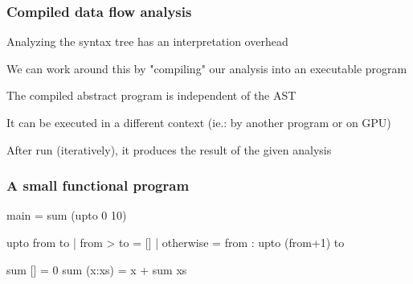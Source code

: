\documentclass[bigger]{beamer}
\begin{document}
\begin{frame}
\frametitle{Compiled data flow analysis}

\begin{vfitemize}
	\item Analyzing the syntax tree has an interpretation overhead
	\item We can work around this by "compiling" our analysis into an executable program
	\item The compiled abstract program is independent of the AST
	\item It can be executed in a different context (ie.: by another program or on GPU)
	\item After run (iteratively), it produces the result of the given analysis
\end{vfitemize}
\end{frame}






















\begin{frame}

\end{frame}

\begin{frame}[fragile]
	\frametitle{A small functional program}
	
	\begin{haskellcode}
	  main = sum (upto 0 10)
	  
	  upto from to
	    | from > to = []
	    | otherwise = from : upto (from+1) to
	                              
	  sum []     = 0
	  sum (x:xs) = x + sum xs
	\end{haskellcode}
	
\end{frame}
\end{document}
